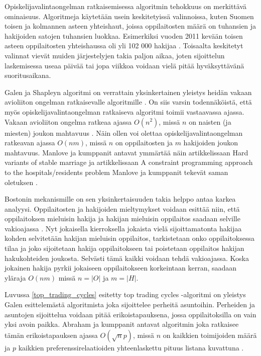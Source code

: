 \documentclass[twoside]{tktltiki}
\begin{document}
Opiskelijavalintaongelman ratkaisemisessa algoritmin tehokkuus on
merkittävä ominaisuus. Algoritmeja käytetään usein keskitetyissä
valinnoissa, kuten Suomen toisen ja kolmannen asteen yhteishaut,
joissa oppilaitosten määrä on tuhansien ja hakijoiden satojen
tuhansien luokkaa. Esimerkiksi vuoden 2011 kevään toisen asteen
oppilaitosten yhteishaussa oli yli 102 000 hakijaa \cite{OPH12}.
Toisaalta keskitetyt valinnat vievät muiden järjestelyjen takia paljon
aikaa, joten sijoittelun laskemisessa useaa päivää tai jopa viikkoa
voidaan vielä pitää hyväksyttävänä suoritusaikana.

Galen ja Shapleyn algoritmi on verrattain yksinkertainen yleistys
heidän vakaan avioliiton ongelman ratkaisevalle algoritmille
\cite{gusfield89}. On siis varsin todennäköistä, että myös
opiskelijavalintaongelman ratkaiseva algoritmi toimii vastaavassa
ajassa. Vakaan avioliiton ongelma ratkeaa ajassa $O(n^2)$, missä $n$
on naisten (ja miesten) joukon mahtavuus \cite{gusfield89}. Näin ollen
voi olettaa opiskelijavalintaongelman ratkeavan ajassa $O(nm)$, missä
$n$ on oppilaitosten ja $m$ hakijoiden joukon mahtavuus. Manlove ja
kumppanit antavat ymmärtää näin artikkelissaan Hard variants of stable
marriage \cite{manlove02} ja artikkelissaan A constraint programming
approach to the hospitals/residents problem Manlove ja kumppanit
tekevät saman oletuksen \cite{manlove07}.

Bostonin mekanismille on sen yksinkertaisuuden takia helppo antaa
karkea analyysi. Oppilaitosten ja hakijoiden mieltymykset voidaan
esittää niin, että oppilaitoksen mieluisin hakija ja hakijan mieluisin
oppilaitos saadaan selville vakioajassa \cite{gusfield89}. Nyt
jokaisella kierroksella jokaista vielä sijoittamatonta hakijaa kohden
selvitetään hakijan mieluisin oppilaitos, tarkistetaan onko
oppilaitoksessa tilaa ja joko sijoitetaan hakija oppilaitokseen tai
poistetaan oppilaitos hakijan hakukohteiden joukosta. Selvästi tämä
kaikki voidaan tehdä vakioajassa. Koska jokainen hakija pyrkii
jokaiseen oppilaitokseen korkeintaan kerran, saadaan yläraja $O(nm)$
missä $n = |O|$ ja $m = |H|$.

Luvussa \ref{top_trading_cycles} esitetty top trading cycles
-algoritmi on yleistys Galen esittelemästä algoritmista joka
sijoittelee perheitä asuntoihin. Perheiden ja asuntojen sijoittelua
voidaan pitää erikoistapauksena, jossa oppilaitoksilla on vain yksi
avoin paikka. Abraham ja kumppanit antavat algoritmin joka ratkaisee
tämän erikoistapauksen ajassa $O(\sqrt np)$, missä $n$ on kaikkien
toimijoiden määrä ja $p$ kaikkien preferenssirelaatioiden
yhteenlaskettu pituus listana kuvattuna \cite{abraham05}.
\end{document}
